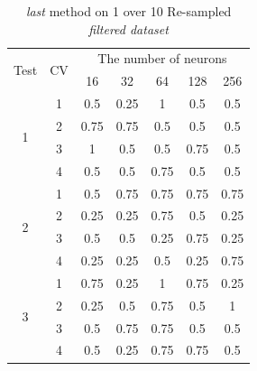 \documentclass[draft,dvipsnames]{drexel-thesis}
\begin{document}
\begin{thesis}
\begin{table}[!t]
\centering
\caption{{\em last} method on 1 over 10 Re-sampled {\em filtered dataset}}
\label{tbl:last_1_10}
\begin{tabular}{|c|c|c|c|c|c|c|}
\hline
\multirow{2}{*}{Test} & \multirow{2}{*}{CV} & \multicolumn{5}{c|}{The number of neurons}                               \\ \cline{3-7}
                      &                     & 16           & 32           & 64           & 128          & 256          \\ \hline
\multirow{4}{*}{1}    & 1                   & 0.5          & 0.25         & 1            & 0.5          & 0.5          \\ \cline{2-7}
                      & 2                   & 0.75         & 0.75         & 0.5          & 0.5          & 0.5          \\ \cline{2-7}
                      & 3                   & 1            & 0.5          & 0.5          & 0.75         & 0.5          \\ \cline{2-7}
                      & 4                   & 0.5          & 0.5          & 0.75         & 0.5          & 0.5          \\ \hline
\multirow{4}{*}{2}    & 1                   & 0.5          & 0.75         & 0.75         & 0.75         & 0.75         \\ \cline{2-7}
                      & 2                   & 0.25         & 0.25         & 0.75         & 0.5          & 0.25         \\ \cline{2-7}
                      & 3                   & 0.5          & 0.5          & 0.25         & 0.75         & 0.25         \\ \cline{2-7}
                      & 4                   & 0.25         & 0.25         & 0.5          & 0.25         & 0.75         \\ \hline
\multirow{4}{*}{3}    & 1                   & 0.75         & 0.25         & 1            & 0.75         & 0.25         \\ \cline{2-7}
                      & 2                   & 0.25         & 0.5          & 0.75         & 0.5          & 1            \\ \cline{2-7}
                      & 3                   & 0.5          & 0.75         & 0.75         & 0.5          & 0.5          \\ \cline{2-7}
                      & 4                   & 0.5          & 0.25         & 0.75         & 0.75         & 0.5          \\ \hline

\end{tabular}
\end{table}
\end{thesis}
\end{document}
